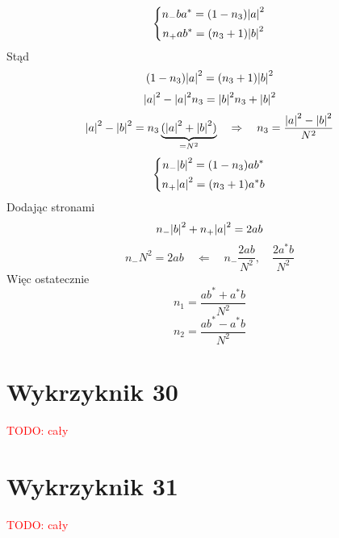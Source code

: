\documentclass[a4paper,12pt]{article}
\newcommand\myworries[1]{\textcolor{red}{#1}} %
\begin{document}
\begin{equation*}
  \left\{\begin{gathered}
      n_{-} b a^* = (1-n_3)\abs{a}^2  \\
      n_{+} a b^*=  (n_3 +1) \abs{b}^2 
  \end{gathered}\right.
\end{equation*}
Stąd
\begin{equation*}
  (1-n_3)\abs{a}^2 =(n_3 +1) \abs{b}^2  
\end{equation*}
\begin{equation*}
  \abs{a}^2 - \abs{a}^2n_3 = \abs{b}^2n_3 + \abs{b}^2
\end{equation*}
\begin{equation*}
  \abs{a}^2 - \abs{b}^2 = n_3 \underbrace{(\abs{a}^2 + \abs{b}^2)}_{=N^2} \quad
  \Rightarrow \quad n_3 = \frac{\abs{a}^2 - \abs{b}^2 }{N^2}
\end{equation*}
\begin{equation*}
  \left\{\begin{gathered}
      n_{-} \abs{b}^2 = (1-n_3)ab^*  \\
      n_{+} \abs{a}^2=  (n_3 +1)a^*b
  \end{gathered}\right.
\end{equation*}
Dodając stronami
\begin{equation*}
  n_{-} \abs{b}^2 + n_{+} \abs{a}^2= 2ab
\end{equation*}
\begin{equation*}
  n_{-} N^2 = 2ab \quad \Leftarrow \quad n_{-} \frac{2ab}{N^2}, \quad
  \frac{2a^*b}{N^2}
\end{equation*}
Więc ostatecznie
\begin{equation*}
  n_1 = \frac{ab^* + a^*b}{N^2}
\end{equation*}
\begin{equation*}
  n_2 = \frac{ab^* - a^*b}{N^2}
\end{equation*}

\section{Wykrzyknik 30}
\myworries{TODO: cały}

\section{Wykrzyknik 31}
\myworries{TODO: cały}
\end{document}
